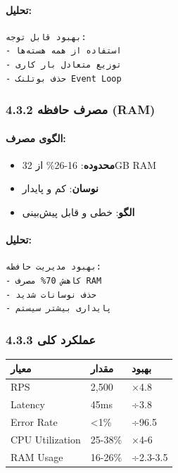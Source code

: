 \documentclass[
]{article}
\newcounter{none} %
\providecommand{\tightlist}{%
  \setlength{\itemsep}{0pt}\setlength{\parskip}{0pt}}
\begin{document}
\paragraph{تحلیل:}\label{ux62aux62dux644ux6ccux644-2}

\begin{verbatim}
بهبود قابل توجه:
- استفاده از همه هسته‌ها
- توزیع متعادل بار کاری
- حذف بوتلنک Event Loop
\end{verbatim}

\subsubsection{4.3.2 مصرف حافظه
(RAM)}\label{ux645ux635ux631ux641-ux62dux627ux641ux638ux647-ram-1}

\paragraph{الگوی
مصرف:}\label{ux627ux644ux6afux648ux6cc-ux645ux635ux631ux641-1}

\begin{itemize}
\tightlist
\item
  \textbf{محدوده}: 16-26\% از 32GB RAM
\item
  \textbf{نوسان}: کم و پایدار
\item
  \textbf{الگو}: خطی و قابل پیش‌بینی
\end{itemize}

\paragraph{تحلیل:}\label{ux62aux62dux644ux6ccux644-3}

\begin{verbatim}
بهبود مدیریت حافظه:
- کاهش 70% مصرف RAM
- حذف نوسانات شدید
- پایداری بیشتر سیستم
\end{verbatim}

\subsubsection{4.3.3 عملکرد
کلی}\label{ux639ux645ux644ux6a9ux631ux62f-ux6a9ux644ux6cc-1}

{\def\LTcaptype{none} %
\begin{longtable}[]{@{}lll@{}}
\toprule\noalign{}
معیار & مقدار & بهبود \\
\midrule\noalign{}
\endhead
\bottomrule\noalign{}
\endlastfoot
RPS & 2,500 & ×4.8 \\
Latency & 45ms & ÷3.8 \\
Error Rate & \textless1\% & ÷96.5 \\
CPU Utilization & 25-38\% & ×4-6 \\
RAM Usage & 16-26\% & ÷2.3-3.5 \\
\end{longtable}
}
\end{document}
